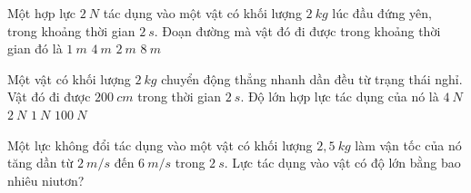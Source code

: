 \begin{vidu}%
Một hợp lực $2\ N$ tác dụng vào một vật có khối lượng $2\ kg$ lúc đầu đứng yên, trong khoảng thời gian $2\ s$. Đoạn đường mà vật đó đi được trong khoảng thời gian đó là
\choice
{$1\ m$}
{$4\ m$}
{\True $2\ m$}
{$8\ m$}
 \end{vidu}
\begin{vidu}%
Một vật có khối lượng $2\ kg$ chuyển động thẳng nhanh dần đều từ trạng thái nghỉ. Vật đó đi được $200\ cm$ trong thời gian $2\ s$. Độ lớn hợp lực tác dụng của nó là
\choice
{$4\ N$}
{\True $2\ N$}
{$1\ N$}
{$100\ N$}

 \end{vidu}
\begin{vidu}
Một lực không đổi tác dụng vào một vật có khối lượng $2,5\ kg$ làm vận tốc của nó tăng dần từ $2\ m/s$ đến $6\ m/s$ trong $2\ s$. Lực tác dụng vào vật có độ lớn bằng bao nhiêu niutơn?
  \end{vidu}

